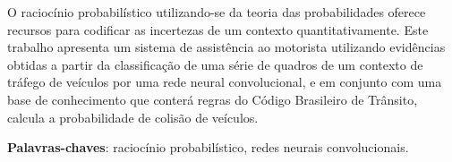 \documentclass[
	12pt,				%
    oneside,			%
	a4paper,			%
	english,			%
	french,				%
	spanish,			%
	brazil,				%
	]{abntex2}
\begin{document}
\frenchspacing 


\imprimircapa

\imprimirfolhaderosto*






\begin{resumo} %
O raciocínio probabilístico utilizando-se da teoria das probabilidades oferece recursos para codificar as incertezas de um contexto quantitativamente. Este trabalho apresenta um sistema de assistência ao motorista utilizando evidências obtidas a partir da classificação de uma série de quadros de um contexto de tráfego de veículos por uma rede neural convolucional, e em conjunto com uma base de conhecimento que conterá regras do Código Brasileiro de Trânsito, calcula a probabilidade de colisão de veículos.


 \vspace{\onelineskip}
    
 \noindent
 \textbf{Palavras-chaves}: raciocínio probabilístico, redes neurais convolucionais.
\end{resumo} %

\end{document}
